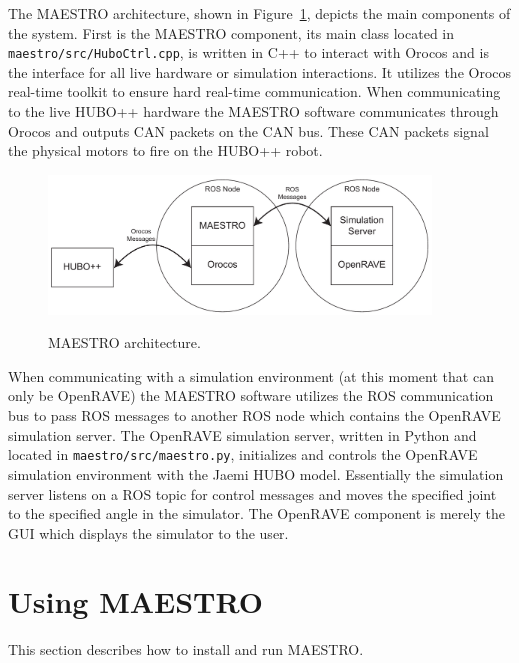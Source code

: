 \documentclass{article}
\begin{document}
The MAESTRO architecture, shown in Figure~\ref{fig:maestro-arch},
depicts the main components of the system. First is the MAESTRO
component, its main class located in \texttt{maestro/src/HuboCtrl.cpp},
is written in C++ to interact with Orocos and is the interface for all
live hardware or simulation interactions. It utilizes the Orocos
real-time toolkit to ensure hard real-time communication. When
communicating to the live HUBO++ hardware the MAESTRO software
communicates through Orocos and outputs CAN packets on the CAN bus.
These CAN packets signal the physical motors to fire on the HUBO++
robot.

\begin{figure}[H]
    \centering
    \includegraphics[width=4in]{./art/maestro-architecture.pdf}
    \label{fig:maestro-arch}
    \caption{MAESTRO architecture.}
\end{figure}

When communicating with a simulation environment (at this moment that
can only be OpenRAVE) the MAESTRO software utilizes the ROS
communication bus to pass ROS messages to another ROS node which
contains the OpenRAVE simulation server. The OpenRAVE simulation server,
written in Python and located in \texttt{maestro/src/maestro.py},
initializes and controls the OpenRAVE simulation environment with the
Jaemi HUBO model. Essentially the simulation server listens on a ROS topic for
control messages and moves the specified joint to the specified angle in
the simulator. The OpenRAVE component is merely the GUI which displays
the simulator to the user.

\section{Using MAESTRO}
This section describes how to install and run MAESTRO.
\end{document}
